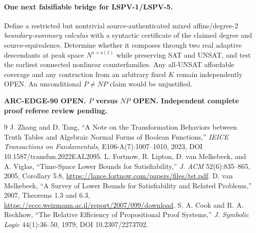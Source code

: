 \documentclass[11pt]{article}
\begin{document}
\paragraph{One next falsifiable bridge for LSPV-1/LSPV-5.} Define a restricted but nontrivial source-authenticated mixed affine/degree-$2$ \emph{boundary-summary calculus} with a syntactic certificate of the claimed degree and source-equivalence. Determine whether it composes through two real adaptive descendants at peak space $N^{s+o(1)}$ while preserving SAT and UNSAT, and test the earliest connected nonlinear counterfamilies. Any all-UNSAT affordable coverage and any contraction from an arbitrary fixed $K$ remain independently OPEN. An unconditional $P\ne NP$ claim would be unjustified.

\noindent\textbf{ARC-EDGE-90 OPEN. $P$ versus $NP$ OPEN. Independent complete proof referee review pending.}
\begin{thebibliography}{9}
 J. Zhang and D. Tang, ``A Note on the Transformation Behaviors between Truth Tables and Algebraic Normal Forms of Boolean Functions,'' \emph{IEICE Transactions on Fundamentals}, E106-A(7):1007--1010, 2023, DOI 10.1587/transfun.2022EAL2095.
 L. Fortnow, R. Lipton, D. van Melkebeek, and A. Viglas, ``Time-Space Lower Bounds for Satisfiability,'' \emph{J. ACM} 52(6):835--865, 2005, Corollary 5.8, \url{https://lance.fortnow.com/papers/files/tst.pdf}.
 D. van Melkebeek, ``A Survey of Lower Bounds for Satisfiability and Related Problems,'' 2007, Theorems 1.3 and 6.3, \url{https://eccc.weizmann.ac.il/report/2007/099/download}.
 S. A. Cook and R. A. Reckhow, ``The Relative Efficiency of Propositional Proof Systems,'' \emph{J. Symbolic Logic} 44(1):36--50, 1979, DOI 10.2307/2273702.
\end{thebibliography}
\end{document}
